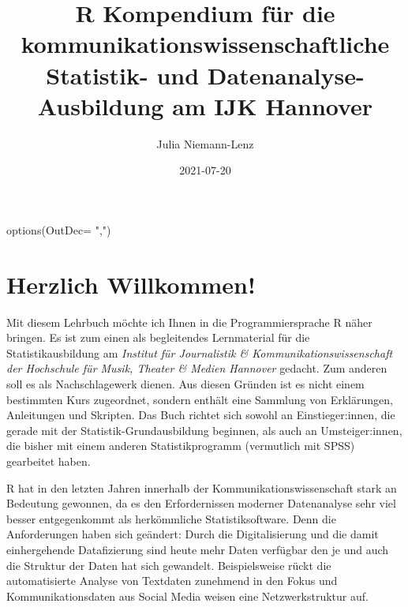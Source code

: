 \documentclass[
]{book}
\title{R Kompendium für die kommunikationswissenschaftliche Statistik- und Datenanalyse-Ausbildung am IJK Hannover}
\author{Julia Niemann-Lenz}
\date{2021-07-20}
\newenvironment{Shaded}{\begin{snugshade}}{\end{snugshade}}
\newcommand{\AttributeTok}[1]{\textcolor[rgb]{0.77,0.63,0.00}{#1}}
\newcommand{\FunctionTok}[1]{\textcolor[rgb]{0.00,0.00,0.00}{#1}}
\newcommand{\NormalTok}[1]{#1}
\newcommand{\StringTok}[1]{\textcolor[rgb]{0.31,0.60,0.02}{#1}}
\begin{document}
\maketitle

{
\setcounter{tocdepth}{1}
\tableofcontents
}
\begin{Shaded}
\begin{Highlighting}[]
\FunctionTok{options}\NormalTok{(}\AttributeTok{OutDec=} \StringTok{","}\NormalTok{)}
\end{Highlighting}
\end{Shaded}

\hypertarget{herzlich-willkommen}{%
\chapter*{Herzlich Willkommen!}\label{herzlich-willkommen}}

Mit diesem Lehrbuch möchte ich Ihnen in die Programmiersprache R näher bringen. Es ist zum einen als begleitendes Lernmaterial für die Statistikausbildung am \emph{Institut für Journalistik \& Kommunikationswissenschaft der Hochschule für Musik, Theater \& Medien Hannover} gedacht. Zum anderen soll es als Nachschlagewerk dienen. Aus diesen Gründen ist es nicht einem bestimmten Kurs zugeordnet, sondern enthält eine Sammlung von Erklärungen, Anleitungen und Skripten. Das Buch richtet sich sowohl an Einstieger:innen, die gerade mit der Statistik-Grundausbildung beginnen, als auch an Umsteiger:innen, die bisher mit einem anderen Statistikprogramm (vermutlich mit SPSS) gearbeitet haben.

R hat in den letzten Jahren innerhalb der Kommunikationswissenschaft stark an Bedeutung gewonnen, da es den Erfordernissen moderner Datenanalyse sehr viel besser entgegenkommt als herkömmliche Statistiksoftware. Denn die Anforderungen haben sich geändert: Durch die Digitalisierung und die damit einhergehende Datafizierung sind heute mehr Daten verfügbar den je und auch die Struktur der Daten hat sich gewandelt. Beispielsweise rückt die automatisierte Analyse von Textdaten zunehmend in den Fokus und Kommunikationsdaten aus Social Media weisen eine Netzwerkstruktur auf.
\end{document}
